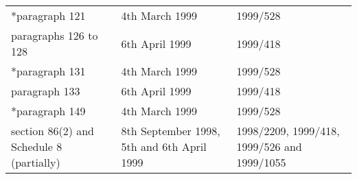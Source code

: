 \documentclass[12pt,a4paper]{article}
\begin{document}
{\begin{longtable}{p{193.78079pt}p{78.37471pt}p{81.83215pt}}
{}*paragraph 121	&4th March 1999	&1999/528\\
paragraphs 126 to 128	&6th April 1999	&1999/418\\
{}*paragraph 131	&4th March 1999	&1999/528\\
paragraph 133	&6th April 1999	&1999/418\\
{}*paragraph 149	&4th March 1999	&1999/528\\
section 86(2) and Schedule 8 (partially)	&8th September 1998, 5th and 6th April 1999	&1998/2209, 1999/418, 1999/526 and 1999/1055\\
\end{longtable}

}
\end{document}
